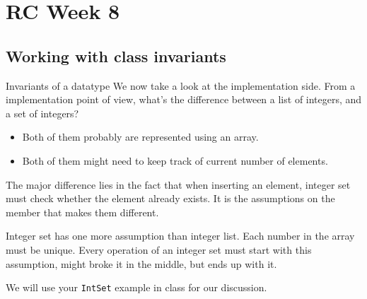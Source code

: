 \section{RC Week 8}

\subsection{Working with class invariants}	
\begin{frame}{Invariants of a datatype}
We now take a look at the implementation side. From a implementation point of view, what's the difference between a list of integers, and a set of integers? 
\begin{itemize}
	\item Both of them probably are represented using an array.
	\item Both of them might need to keep track of current number of elements. 
\end{itemize} 
The major difference lies in the fact that when inserting an element, integer set must check whether the element already exists. It is the assumptions on the member that makes them different.

\vspace{0.05in}
Integer set has one more assumption than integer list. Each number in the array must be unique. Every operation of an integer set must start with this assumption, might broke it in the middle, but ends up with it.

\vspace{0.05in}
We will use your \texttt{IntSet} example in class for our discussion.
\end{frame}

